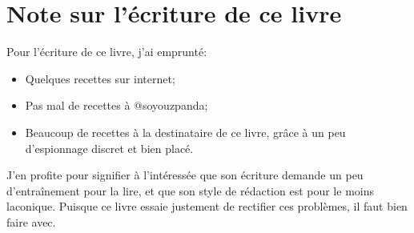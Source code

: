 \newpage
\section*{Note sur l'écriture de ce livre}

Pour l'écriture de ce livre, j'ai emprunté:
\begin{itemize}
	\item Quelques recettes sur internet;
	\item Pas mal de recettes à @soyouzpanda;
	\item Beaucoup de recettes à la destinataire de ce livre, grâce à un peu
	      d'espionnage discret et bien placé.
\end{itemize}

J'en profite pour signifier à l'intéressée que son écriture demande un peu
d'entraînement pour la lire, et que son style de rédaction est pour le moins
laconique.
Puisque ce livre essaie justement de rectifier ces problèmes, il faut bien
faire avec.

